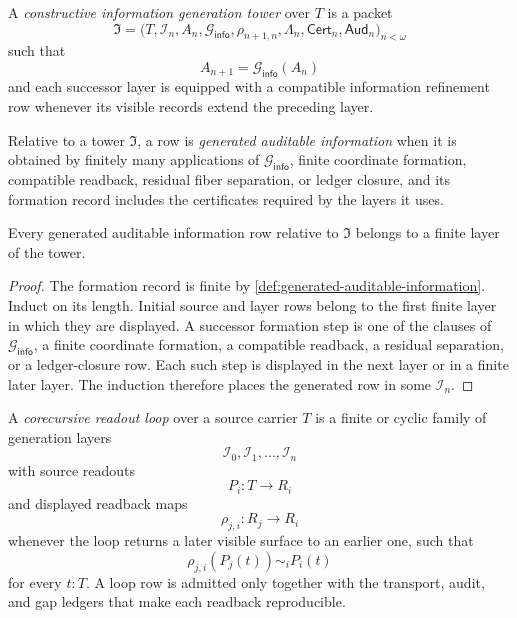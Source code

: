 \begin{definition}
\label{def:constructive-information-generation-tower}
A \emph{constructive information generation tower} over $T$ is a packet
$$
\mathfrak I
=
\bigl(T,\mathcal I_n,A_n,\mathcal G_{\mathsf{info}},
\rho_{n+1,n},\Lambda_n,\mathsf{Cert}_n,\mathsf{Aud}_n\bigr)_{n<\omega}
$$
such that
$$
A_{n+1}=\mathcal G_{\mathsf{info}}(A_n)
$$
and each successor layer is equipped with a compatible information
refinement row whenever its visible records extend the preceding layer.
\end{definition}

\begin{definition}
\label{def:generated-auditable-information}
Relative to a tower $\mathfrak I$, a row is \emph{generated auditable
information} when it is obtained by finitely many applications of
$\mathcal G_{\mathsf{info}}$, finite coordinate formation, compatible
readback, residual fiber separation, or ledger closure, and its
formation record includes the certificates required by the layers it
uses.
\end{definition}

\begin{theorem}
\label{thm:relative-absence-tower-external-information}
Every generated auditable information row relative to
$\mathfrak I$ belongs to a finite layer of the tower.
\end{theorem}

\begin{proof}
The formation record is finite by
\autoref{def:generated-auditable-information}. Induct on its length.
Initial source and layer rows belong to the first finite layer in which
they are displayed. A successor formation step is one of the clauses of
$\mathcal G_{\mathsf{info}}$, a finite coordinate formation, a
compatible readback, a residual separation, or a ledger-closure row.
Each such step is displayed in the next layer or in a finite later
layer. The induction therefore places the generated row in some
$\mathcal I_n$.
\end{proof}

\begin{definition}
\label{def:corecursive-readout-loop}
A \emph{corecursive readout loop} over a source carrier $T$ is a finite
or cyclic family of generation layers
$$
\mathcal I_0,\mathcal I_1,\ldots,\mathcal I_n
$$
with source readouts
$$
P_i:T\to R_i
$$
and displayed readback maps
$$
\rho_{j,i}:R_j\to R_i
$$
whenever the loop returns a later visible surface to an earlier one,
such that
$$
\rho_{j,i}(P_j(t))\sim_i P_i(t)
$$
for every $t:T$. A loop row is admitted only together with the
transport, audit, and gap ledgers that make each readback reproducible.
\end{definition}

